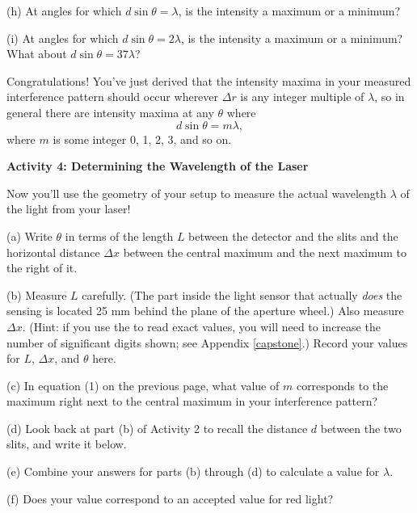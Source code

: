 (h) At angles for which $d \sin \theta = \lambda$, is the intensity a maximum or a minimum?
\answerspace{0.2in}

(i) At angles for which $d \sin \theta = 2 \lambda$, is the intensity a maximum or a minimum?  What about $d \sin \theta = 37 \lambda$?
\answerspace{0.2in}

Congratulations!  You've just derived that the intensity maxima in your measured interference pattern should occur wherever $\Delta r$ is any integer multiple of $\lambda$, so in general there are intensity maxima at any $\theta$ where
\begin{equation}
d \sin \theta = m \lambda,
\end{equation}
where $m$ is some integer 0, 1, 2, 3, and so on.  



\pagebreak[3]
\textbf{Activity 4: Determining the Wavelength of the Laser }

Now you'll use the geometry of your setup to measure the actual wavelength $\lambda$ of the light from your laser!




(a) Write $\theta$ in terms of the length $L$ between the detector and the slits and the horizontal distance $\Delta x$ between the central maximum and the next maximum to the right of it.
\answerspace{0.4in}

(b) Measure $L$ carefully.  (The part inside the light sensor that actually \textit{does} the sensing is located 25 mm behind the plane of the aperture wheel.)  
Also measure $\Delta x$.  (Hint: if you use the  to read exact values, you will need to increase the number of significant digits shown; see Appendix \ref{capstone}.)
Record your values for $L$, $\Delta x$, and $\theta$ here.

\answerspace{0.8in}

(c) In equation (1) on the previous page, what value of $m$ corresponds to the maximum right next to the central maximum in your interference pattern?
\answerspace{0.3in}
 
(d) Look back at part (b) of Activity 2 to recall the distance $d$ between the two slits, and write it below.
\answerspace{0.3in}

(e) Combine your answers for parts (b) through (d) to calculate a value for $\lambda$.  
\answerspace{1in}

(f) Does your value correspond to an accepted value for red light?
\answerspace{0.3in}

